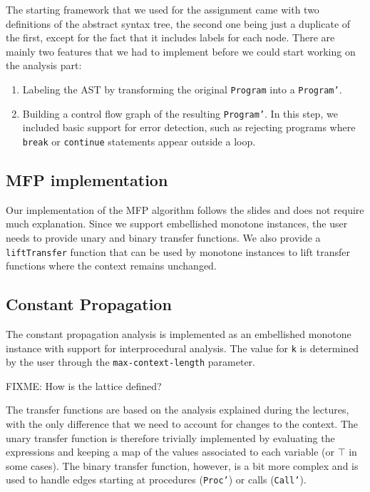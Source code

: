 \documentclass{article}
\begin{document}
The starting framework that we used for the assignment came with two definitions of the abstract syntax tree, the second one being just a duplicate of the first, except for the fact that it includes labels for each node. There are mainly two features that we had to implement before we could start working on the analysis part:

\begin{enumerate}
	\item Labeling the AST by transforming the original \texttt{Program} into a \texttt{Program'}.
	\item Building a control flow graph of the resulting \texttt{Program'}. In this step, we included basic support for error detection, such as rejecting programs where \texttt{break} or \texttt{continue} statements appear outside a loop.
\end{enumerate}

\subsection*{MFP implementation}

Our implementation of the MFP algorithm follows the slides and does not require much explanation. Since we support embellished monotone instances, the user needs to provide unary and binary transfer functions. We also provide a \texttt{liftTransfer} function that can be used by monotone instances to lift transfer functions where the context remains unchanged.

\subsection*{Constant Propagation}

The constant propagation analysis is implemented as an embellished monotone instance with support for interprocedural analysis. The value for \texttt{k} is determined by the user through the \texttt{max-context-length} parameter.

FIXME: How is the lattice defined?

The transfer functions are based on the analysis explained during the lectures, with the only difference that we need to account for changes to the context. The unary transfer function is therefore trivially implemented by evaluating the expressions and keeping a map of the values associated to each variable (or $\top$ in some cases). The binary transfer function, however, is a bit more complex and is used to handle edges starting at procedures (\texttt{Proc'}) or calls (\texttt{Call'}).
\end{document}

